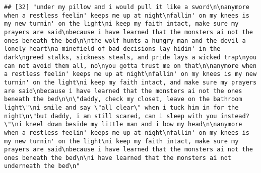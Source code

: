 \documentclass[]{article}
\begin{document}
\begin{verbatim}
## [32] "under my pillow and i would pull it like a sword\n\nanymore when a restless feelin' keeps me up at night\nfallin' on my knees is my new turnin' on the light\ni keep my faith intact, make sure my prayers are said\nbecause i have learned that the monsters ai not the ones beneath the bed\n\nthe wolf hunts a hungry man and the devil a lonely heart\na minefield of bad decisions lay hidin' in the dark\ngreed stalks, sickness steals, and pride lays a wicked trap\nyou can not avoid them all, no\nyou gotta trust me on that\n\nanymore when a restless feelin' keeps me up at night\nfallin' on my knees is my new turnin' on the light\ni keep my faith intact, and make sure my prayers are said\nbecause i have learned that the monsters ai not the ones beneath the bed\n\n\"daddy, check my closet, leave on the bathroom light\"\ni smile and say \"all clear\" when i tuck him in for the night\n\"but daddy, i am still scared, can i sleep with you instead?\"\ni kneel down beside my little man and i bow my head\n\nanymore when a restless feelin' keeps me up at night\nfallin' on my knees is my new turnin' on the light\ni keep my faith intact, make sure my prayers are said\nbecause i have learned that the monsters ai not the ones beneath the bed\n\ni have learned that the monsters ai not underneath the bed\n"                                                                                                                                                                                                                                                                                                                                                                                                                                                                                                                                                                                                                                                                                                                                                                                                                                                                                                                                                                                                                                                                                                                                                                                                                                                                                                                                                                                                                                                                                                                                                                                                                           

\end{verbatim}
\end{document}

